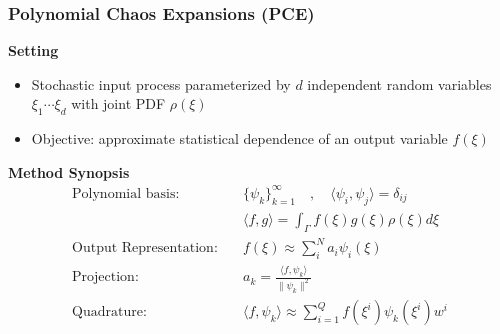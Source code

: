 \documentclass[9pt]{beamer}
\newcommand{\beqq}[0]{\begin{equation*}}
\newcommand{\eeqq}[0]{\end{equation*}}
\begin{document}
\begin{frame}
\frametitle{Polynomial Chaos Expansions (PCE)}
\label{sec-6-6}

\textbf{Setting}
\begin{itemize}
\item Stochastic input process parameterized by $d$ independent random
  variables $\xi_1 \cdots \xi_d$ with joint PDF $\rho(\xi)$
\item Objective: approximate statistical dependence of an output variable $f(\xi)$
\end{itemize}
\textbf{Method Synopsis}
\beqq
\begin{aligned}
\text{Polynomial basis:} \quad & \lbrace \psi_k \rbrace_{k=1}^{\infty} \quad , \quad \langle \psi_i , \psi_j \rangle = \delta_{ij} \\
&\langle f , g \rangle = \int_{\Gamma} f(\xi) g(\xi) \rho(\xi) d\xi \\
\text{Output Representation:} \quad & f(\xi) \approx \sum_{i}^N a_i \psi_i(\xi) \\
\text{Projection:} \quad & a_k = \frac{\langle f,\psi_k \rangle}{\| \psi_k \|^2} \\
\text{Quadrature:} \quad & \langle f,\psi_k \rangle \approx \sum_{i=1}^Q f(\xi^i) \psi_k(\xi^i) w^i \\
\end{aligned}
\eeqq
\end{frame}
\end{document}

